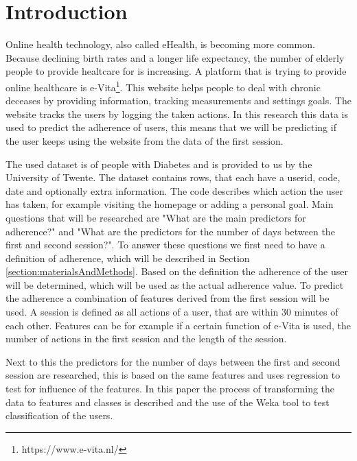 \section{Introduction}
Online health technology, also called eHealth, is becoming more common. Because declining birth rates and a longer life expectancy, the number of elderly people to provide healtcare for is increasing. A platform that is trying to provide online healthcare is e-Vita\footnote{https://www.e-vita.nl/}. This website helps people to deal with chronic deceases by providing information, tracking measurements and settings goals. The website tracks the users by logging the taken actions. In this research this data is used to predict the adherence of users, this means that we will be predicting if the user keeps using the website from the data of the first session.

The used dataset is of people with Diabetes and is provided to us by the University of Twente. The dataset contains rows, that each have a userid, code, date and optionally extra information. The code describes which action the user has taken, for example visiting the homepage or adding a personal goal. Main questions that will be researched are "What are the main predictors for adherence?" and "What are the predictors for the number of days between the first and second session?". To answer these questions we first need to have a definition of adherence, which will be described in Section \ref{section:materialsAndMethods}. Based on the definition the adherence of the user will be determined, which will be used as the actual adherence value. To predict the adherence a combination of features derived from the first session will be used. A session is defined as all actions of a user, that are within 30 minutes of each other. Features can be for example if a certain function of e-Vita is used, the number of actions in the first session and the length of the session.

Next to this the predictors for the number of days between the first and second session are researched, this is based on the same features and uses regression to test for influence of the features. In this paper the process of transforming the data to features and classes is described and the use of the Weka \cite{weka} tool to test classification of the users.